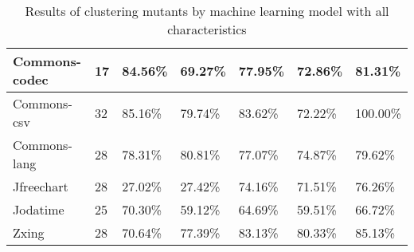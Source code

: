 \documentclass[../../main]{subfiles}
\begin{document}
\begin{table}[!htb]
\begin{tabular}{|l|l|l|l|l|l|l|}
Commons-codec         & 17                                                              & 84.56\%                                                              & 69.27\%                                                                    & 77.95\%                                                               & 72.86\%                                                            & 81.31\%                                                            \\ \hline
Commons-csv           & 32                                                              & 85.16\%                                                              & 79.74\%                                                                    & 83.62\%                                                               & 72.22\%                                                            & 100.00\%                                                           \\ \hline
Commons-lang          & 28                                                              & 78.31\%                                                              & 80.81\%                                                                    & 77.07\%                                                               & 74.87\%                                                            & 79.62\%                                                            \\ \hline
Jfreechart            & 28                                                              & 27.02\%                                                              & 27.42\%                                                                    & 74.16\%                                                               & 71.51\%                                                            & 76.26\%                                                            \\ \hline
Jodatime              & 25                                                              & 70.30\%                                                              & 59.12\%                                                                    & 64.69\%                                                               & 59.51\%                                                            & 66.72\%                                                            \\ \hline
Zxing                 & 28                                                              & 70.64\%                                                              & 77.39\%                                                                    & 83.13\%                                                               & 80.33\%                                                            & 85.13\%                                                            \\ \hline
\end{tabular}
\caption{\label{tab:ml_full}Results of clustering mutants by machine learning model with all characteristics}
\end{table}
\end{document}
